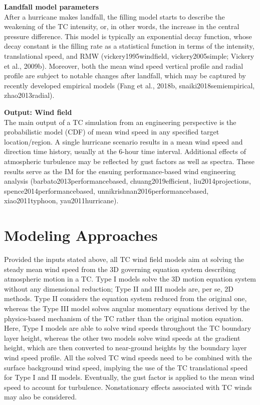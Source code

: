 \noindent\textbf{Landfall model parameters} \\After a hurricane makes landfall, the filling model starts to describe the weakening of the TC intensity, or, in other words, the increase in the central pressure difference. This model is typically an exponential decay function, whose decay constant is the filling rate as a statistical function in terms of the intensity, translational speed, and RMW (vickery1995windfield, vickery2005simple; Vickery et al., 2009b). Moreover, both the mean wind speed vertical profile and radial profile are subject to notable changes after landfall, which may be captured by recently developed empirical models (Fang et al., 2018b, snaiki2018semiempirical, zhao2013radial). 
\newline

\noindent\textbf{Output: Wind field} \\The main output of a TC simulation from an engineering perspective is the probabilistic model (CDF) of mean wind speed in any specified target location/region. A single hurricane scenario results in a mean wind speed and direction time history, usually at the 6-hour time interval. Additional effects of atmospheric turbulence may be reflected by gust factors as well as spectra. These results serve as the IM for the ensuing performance-based wind engineering analysis (barbato2013performancebased, chuang2019efficient, liu2014projections, spence2014performancebased, unnikrishnan2016performancebased, xiao2011typhoon, yau2011hurricane).

\section{Modeling Approaches}
\label{sec:storm_wind_methods}

Provided the inputs stated above, all TC wind field models aim at solving the steady mean wind speed from the 3D governing equation system describing atmospheric motion in a TC. Type I models solve the 3D motion equation system without any dimensional reduction; Type II and III models are, per se, 2D methods. Type II considers the equation system reduced from the original one, whereas the Type III model solves angular momentary equations derived by the physics-based mechanism of the TC rather than the original motion equation. Here, Type I models are able to solve wind speeds throughout the TC boundary layer height, whereas the other two models solve wind speeds at the gradient height, which are then converted to near-ground heights by the boundary layer wind speed profile. All the solved TC wind speeds need to be combined with the surface background wind speed, implying the use of the TC translational speed for Type I and II models. Eventually, the gust factor is applied to the mean wind speed to account for turbulence. Nonstationary effects associated with TC winds may also be considered.
\newline

